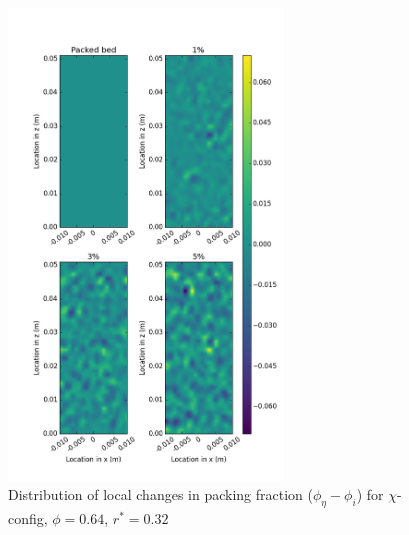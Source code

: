 \begin{figure}[!t]
    \centering
    \includegraphics[width = 0.65\textwidth]{figures/x-62-r23-1-deltas.png}
    \caption{Distribution of local changes in packing fraction ($\phi_{\eta} - \phi_i$) for $\chi$-config, $\phi = 0.64$, $r^* = 0.32$}\label{fig:x-624-r23-deltas}
\end{figure}

